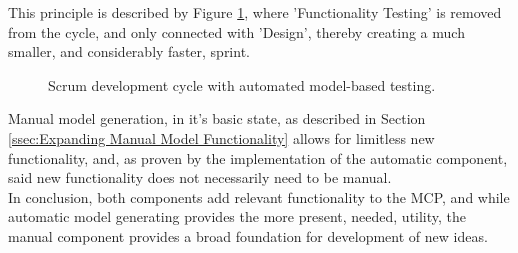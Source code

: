 This principle is described by Figure \ref{fig:scrumSmall}, where 'Functionality Testing' is removed from the cycle, and only connected with 'Design', thereby creating a much smaller, and considerably faster, sprint.
\newpage
\begin{figure}[h]
  \centering
  \caption{Scrum development cycle with automated model-based testing.}
  \label{fig:scrumSmall}
\end{figure}

Manual model generation, in it's basic state, as described in Section \ref{ssec:Expanding Manual Model Functionality} allows for limitless new functionality, and, as proven by the implementation of the automatic component, said new functionality does not necessarily need to be manual.\\[0.5cm]
In conclusion, both components add relevant functionality to the MCP, and while automatic model generating provides the more present, needed, utility, the manual component provides a broad foundation for development of new ideas.

